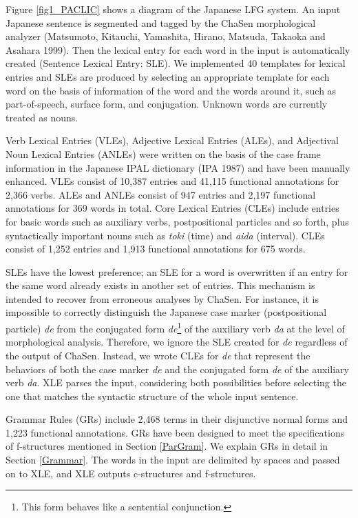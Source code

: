 \documentclass[english]{jnlp_1.4_rep}
\begin{document}
Figure \ref{fig1_PACLIC} shows a diagram of the Japanese LFG system.
An input Japanese sentence is segmented and tagged by the ChaSen
morphological analyzer 
(Matsumoto, Kitauchi, Yamashita, Hirano, Matsuda, Takaoka and Asahara 1999).  
Then the lexical
entry for each word in the input is automatically created (Sentence
Lexical Entry: SLE).  We implemented 40 templates for lexical entries
and SLEs are produced by selecting an appropriate template for each
word on the basis of information of the word and the words around it,
such as part-of-speech, surface form, and conjugation.  Unknown words
are currently treated as nouns.

Verb Lexical Entries (VLEs), Adjective Lexical Entries (ALEs), and
Adjectival Noun Lexical Entries (ANLEs) were written on the basis of the case
frame information in the Japanese IPAL dictionary (IPA 1987) and have
been manually enhanced.  VLEs consist of 10,387 entries and 41,115
functional annotations for 2,366 verbs.  ALEs and ANLEs consist of 947
entries and 2,197 functional annotations for 369 words in total.  Core
Lexical Entries (CLEs) include entries for basic words such as
auxiliary verbs, postpositional particles and so forth, plus
syntactically important nouns such as \textit{toki} (time) and \textit{aida} (interval).
CLEs consist of 1,252 entries and 1,913 functional annotations for 675
words.


SLEs have the lowest preference; an SLE for a word is overwritten if
an entry for the same word already exists in another set of entries.
This mechanism is intended to recover from erroneous analyses by
ChaSen.  For instance, it is impossible to correctly distinguish the
Japanese case marker (postpositional particle) \textit{de} from the
conjugated form \textit{de}\footnote{This form behaves like a
  sentential conjunction.}  of the auxiliary verb \textit{da} at the
level of morphological analysis. Therefore, we ignore the SLE created
for \textit{de} regardless of the output of ChaSen. Instead, we wrote
CLEs for \textit{de} that represent the behaviors of both the case
marker \textit{de} and the conjugated form \textit{de} of the
auxiliary verb \textit{da}. XLE parses the input, considering both
possibilities before selecting the one that matches the syntactic
structure of the whole input sentence.

Grammar Rules (GRs) include 2,468 terms in their disjunctive normal
forms and 1,223 functional annotations.  GRs have been designed to
meet the specifications of f-structures mentioned in Section \ref{ParGram}.
We explain GRs in detail in Section \ref{Grammar}.  The words in the input are
delimited by spaces and passed on to XLE, and XLE outputs c-structures
and f-structures.
\end{document}
